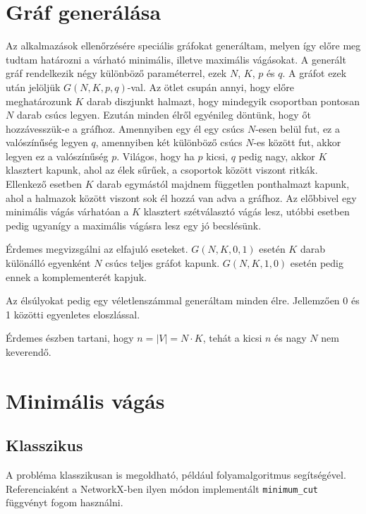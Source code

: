 \section{Gráf generálása}
Az alkalmazások ellenőrzésére speciális gráfokat generáltam, melyen így előre meg tudtam határozni a várható minimális, illetve maximális vágásokat.
A generált gráf rendelkezik négy különböző paraméterrel, ezek $N$, $K$, $p$ és $q$.
A gráfot ezek után jelöljük $G(N,K,p,q)$-val.
Az ötlet csupán annyi, hogy előre meghatározunk $K$ darab diszjunkt halmazt, hogy mindegyik csoportban pontosan $N$ darab csúcs legyen. Ezután minden élről egyénileg döntünk, hogy őt hozzávesszük-e a gráfhoz. Amennyiben egy él egy csúcs $N$-esen belül fut, ez a valószínűség legyen $q$, amennyiben két különböző csúcs $N$-es között fut, akkor legyen ez a valószínűség $p$. Világos, hogy ha $p$ kicsi, $q$ pedig nagy, akkor $K$ klasztert kapunk, ahol az élek sűrűek, a csoportok között viszont ritkák. Ellenkező esetben $K$ darab egymástól majdnem független ponthalmazt kapunk, ahol a halmazok között viszont sok él hozzá van adva a gráfhoz. Az előbbivel egy minimális vágás várhatóan a $K$ klasztert szétválasztó vágás lesz, utóbbi esetben pedig ugyanígy a maximális vágásra lesz egy jó becslésünk.

Érdemes megvizsgálni az elfajuló eseteket. $G(N,K,0,1)$ esetén $K$ darab különálló egyenként $N$ csúcs teljes gráfot kapunk. $G(N,K,1,0)$ esetén pedig ennek a komplementerét kapjuk. 

Az élsúlyokat pedig egy véletlenszámmal generáltam minden élre. Jellemzően 0 és 1 közötti egyenletes eloszlással.

Érdemes észben tartani, hogy $n=|V|=N \cdot K$, tehát a kicsi $n$ és nagy $N$ nem keverendő.

\section{Minimális vágás}


\subsection{Klasszikus}

A probléma klasszikusan is megoldható, például folyamalgoritmus segítségével. Referenciaként a NetworkX-ben ilyen módon implementált \verb+minimum_cut+ függvényt fogom használni.


